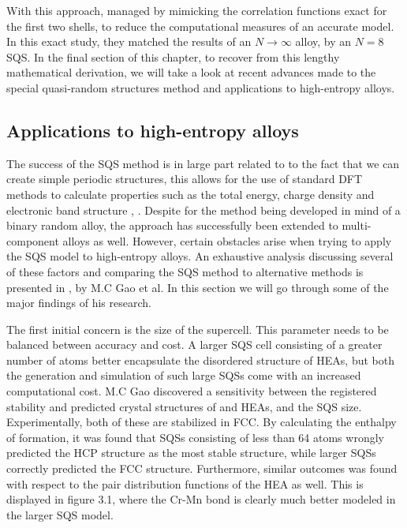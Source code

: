With this approach, \cite{sqsfull} managed by mimicking the correlation functions exact for the first two shells, to reduce the computational measures of an accurate model. In this exact study, they matched the results of an $N \rightarrow \infty$ alloy, by an $N=8$ SQS. In the final section of this chapter, to recover from this lengthy mathematical derivation, we will take a look at recent advances made to the special quasi-random structures method and applications to high-entropy alloys. 

\newpage
\subsection{Applications to high-entropy alloys}
The success of the SQS method is in large part related to to the fact that we can create simple periodic structures, this allows for the use of standard DFT methods to calculate properties such as the total energy, charge density and electronic band structure \cite{sqs_dos}, \cite{sqs_bg}. Despite for the method being developed in mind of a binary random alloy, the approach has successfully been extended to multi-component alloys as well. However, certain obstacles arise when trying to apply the SQS model to high-entropy alloys. An exhaustive analysis discussing several of these factors and comparing the SQS method to alternative methods is presented in \cite{hea2016_ch10}, by M.C Gao et al. In this section we will go through some of the major findings of his research.

The first initial concern is the size of the supercell. This parameter needs to be balanced between accuracy and cost. A larger SQS cell consisting of a greater number of atoms better encapsulate the disordered structure of HEAs, but both the generation and simulation of such large SQSs come with an increased computational cost. M.C Gao discovered a sensitivity between the registered stability and predicted crystal structures of  and  HEAs, and the SQS size. Experimentally, both of these are stabilized in FCC. By calculating the enthalpy of formation, it was found that SQSs consisting of less than 64 atoms wrongly predicted the HCP structure as the most stable structure, while larger SQSs correctly predicted the FCC structure. Furthermore, similar outcomes was found with respect to the pair distribution functions of the  HEA as well. This is displayed in figure 3.1, where the Cr-Mn bond is clearly much better modeled in the larger SQS model. 

